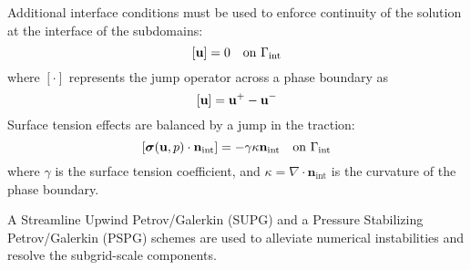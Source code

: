 Additional interface conditions must be used to enforce continuity of the solution at the interface of the subdomains:
%
\begin{equation}
	\centering
	\label{eq:solution_continuity}
	[\mathbf{u}] = 0 \quad \text{on $\Gamma_{\mathrm{int}}$}
\end{equation}
%
\noindent
where $[\cdot]$ represents the jump operator across a phase boundary as
%
\begin{equation}
	\centering
	\label{eq:velocity_continuity}
	[\mathbf{u}] = \mathbf{u}^{+} - \mathbf{u}^{-}
\end{equation}
%
Surface tension effects are balanced by a jump in the traction:
%
\begin{equation}
	\centering
	\label{eq:stress_continuity}
	[\boldsymbol{\sigma}(\mathbf{u},p) \cdot \mathbf{n}_{\mathrm{int}}] = -\gamma \kappa \mathbf{n}_{\mathrm{int}} \quad \text{on $\Gamma_{\mathrm{int}}$}
\end{equation}
%
\noindent
where $\gamma$ is the surface tension coefficient, and $\kappa = \nabla \cdot \mathbf{n}_{\mathrm{int}}$ is the curvature of the phase boundary.

A Streamline Upwind Petrov/Galerkin (SUPG) \citep{TMR+:92} and a Pressure Stabilizing Petrov/Galerkin (PSPG) \citep{BH:82} schemes are used to alleviate numerical instabilities and resolve the subgrid-scale components.

